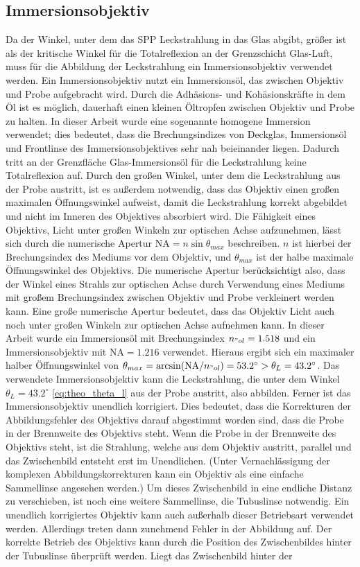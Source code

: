 \documentclass[a4paper, titlepage,  ngerman, fullpage]{book}
\begin{document}
	\subsection{Immersionsobjektiv}
	Da der Winkel, unter dem das SPP Leckstrahlung in das Glas abgibt, größer ist als der kritische Winkel für die Totalreflexion an der Grenzschicht Glas-Luft, muss für die Abbildung der Leckstrahlung ein Immersionsobjektiv verwendet werden. Ein Immersionsobjektiv nutzt ein Immersionsöl, das zwischen Objektiv und Probe aufgebracht wird. Durch die Adhäsions- und Kohäsionskräfte in dem Öl ist es möglich, dauerhaft einen kleinen Öltropfen zwischen Objektiv und Probe zu halten. In dieser Arbeit  wurde eine sogenannte homogene Immersion verwendet; dies bedeutet, dass die Brechungsindizes von Deckglas, Immersionsöl und Frontlinse des Immersionsobjektives sehr nah beieinander liegen. Dadurch tritt an der Grenzfläche Glas-Immersionsöl für die Leckstrahlung keine Totalreflexion auf. Durch den großen Winkel, unter dem die Leckstrahlung aus der Probe austritt, ist es außerdem notwendig, dass das Objektiv einen großen maximalen Öffnungswinkel aufweist, damit die Leckstrahlung korrekt abgebildet und nicht im Inneren des Objektives absorbiert wird. Die Fähigkeit eines Objektivs, Licht unter großen Winkeln zur optischen Achse aufzunehmen, lässt sich durch die numerische Apertur $\mathrm{NA} = n\sin\theta_{max}$ beschreiben. $n$ ist hierbei der Brechungsindex des Mediums vor dem Objektiv, und $\theta_{max}$ ist der halbe maximale Öffnungswinkel des Objektivs. Die numerische Apertur berücksichtigt also, dass der Winkel eines Strahls zur optischen Achse durch Verwendung eines Mediums mit großem Brechungsindex zwischen Objektiv und Probe verkleinert werden kann. Eine große numerische Apertur bedeutet, dass das Objektiv Licht auch noch unter großen Winkeln zur optischen Achse aufnehmen kann. In dieser Arbeit wurde ein Immersionsöl mit Brechungsindex $n_{"ol} = 1.518$ und ein Immersionsobjektiv mit $\mathrm{NA} = 1.216$ verwendet. Hieraus ergibt sich ein maximaler halber Öffnungswinkel von $\theta_{max} = \arcsin(\mathrm{NA} / n_{"ol}) = 53.2^\circ > \theta_L = 43.2^\circ$. Das verwendete Immersionsobjektiv kann die Leckstrahlung, die unter dem Winkel $\theta_L = 43.2^\circ$ \eqref{eq:theo_theta_l} aus der Probe austritt, also abbilden. Ferner ist das Immersionsobjektiv unendlich korrigiert. Dies bedeutet, dass die Korrekturen der Abbildungsfehler des Objektivs darauf abgestimmt worden sind, dass die Probe in der Brennweite des Objektivs steht. Wenn die Probe in der Brennweite des Objektivs steht, ist die Strahlung, welche aus dem Objektiv austritt, parallel und das Zwischenbild entsteht erst im Unendlichen. (Unter Vernachlässigung der komplexen Abbildungskorrekturen kann ein Objektiv als eine einfache Sammellinse angesehen werden.) Um dieses Zwischenbild in eine endliche Distanz zu verschieben, ist noch eine weitere Sammellinse, die Tubuslinse notwendig. Ein unendlich korrigiertes Objektiv kann auch außerhalb dieser Betriebsart verwendet werden. Allerdings treten dann zunehmend Fehler in der Abbildung auf. Der korrekte Betrieb des Objektivs kann durch die Position des Zwischenbildes hinter der Tubuslinse überprüft werden. Liegt das Zwischenbild hinter der 
\end{document}
